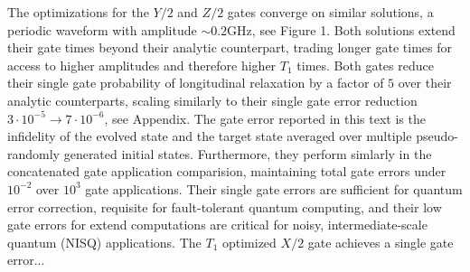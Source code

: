 \documentclass[
  amsfonts,
  amsmath,
  tbtags,
  amssymb,
  aps,
  nobibnotes,
  twocolumn,
  superscriptaddress,
]{revtex4-2}
\begin{document}
The optimizations for the $Y/2$ and $Z/2$ gates converge on similar solutions, a periodic
waveform with amplitude $\sim 0.2 \textrm{GHz}$, see Figure 1.
Both solutions extend their gate times
beyond their analytic counterpart, trading longer gate times for access
to higher amplitudes and therefore higher $T_{1}$ times. Both gates reduce
their single gate probability of longitudinal relaxation by a factor of $5$ over
their analytic counterparts, scaling similarly to their single gate error reduction
$3 \cdot 10^{-5} \rightarrow 7 \cdot 10^{-6}$, see Appendix.
The gate error reported in this text is the infidelity of the evolved state and the target state
averaged over multiple pseudo-randomly generated initial states.
Furthermore, they perform simlarly in
the concatenated gate application comparision, maintaining total gate errors under $10^{-2}$
over $10^{3}$ gate applications. Their single gate errors are sufficient for
quantum error correction, requisite for fault-tolerant quantum computing,
and their low gate errors for extend computations are critical for noisy, intermediate-scale
quantum (NISQ) applications.
The $T_{1}$ optimized $X/2$ gate achieves a single gate error...
\end{document}
